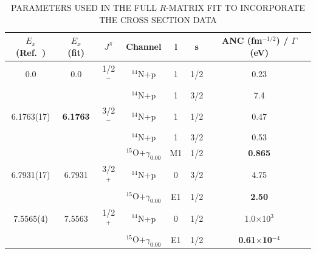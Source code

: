 \begin{table}[]
\caption{PARAMETERS USED IN THE FULL $R$-MATRIX FIT TO INCORPORATE THE CROSS SECTION DATA}
\begin{center}
\begin{threeparttable}
\begin{tabular}{c  c  c  c  c  c  c}
\toprule
$E_x$ (Ref.~\cite{Ajzenberg-Selove1991, Daigle2016}) &   $E_x$ (fit) & $J^\pi$ & Channel & l & s & ANC (fm$^{-1/2}$) / $\Gamma$ (eV)\\ 
\midrule
0.0 & 0.0	& 1/2$^-$ &	$^{14}$N+p &	1&	1/2&	{0.23}\\
	&	&	    &    $^{14}$N+p &	1&	3/2&	{7.4} \\
6.1763(17) & \textbf{6.1763}&	3/2$^-$& $^{14}$N+p &	1&	1/2&	{0.47}\\
				&	&	& $^{14}$N+p	&1	&3/2	&{0.53}\\
				&	&	&$^{15}$O+$\gamma_{0.00}$	&M1	&1/2&	\textbf{0.865}\\
6.7931(17) & {6.7931}&	3/2$^+$ & $^{14}$N+p &	0&	3/2&	{4.75}\\
	&	&	     &  $^{15}$O+$\gamma_{0.00}$	&  E1  &	1/2&	\textbf{2.50}\\
\hline
7.5565(4) & 7.5563	&	1/2$^+$	&	$^{14}$N+p	&	0	&	1/2	&	{1.0$\times$10$^3$}	\\
	&	&	&	$^{15}$O+$\gamma_{0.00}$	&	E1	&	1/2	&	\textbf{0.61$\times$10$^{-4}$}\\

\end{tabular}
\end{threeparttable}
\end{center}
\end{table}
